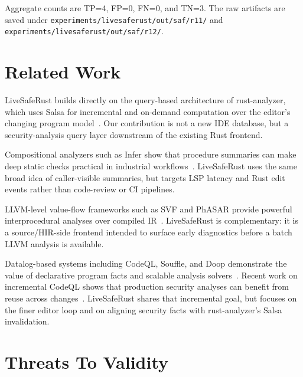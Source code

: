 \documentclass[sigconf,nonacm]{acmart}
\begin{document}
Aggregate counts are TP=4, FP=0, FN=0, and TN=3. The raw artifacts are saved
under \texttt{experiments/livesaferust/out/saf/r11/} and
\texttt{experiments/livesaferust/out/saf/r12/}.

\section{Related Work}

LiveSafeRust builds directly on the query-based architecture of
rust-analyzer, which uses Salsa for incremental and on-demand computation over
the editor's changing program model~\cite{rustanalyzer,salsa}. Our contribution
is not a new IDE database, but a security-analysis query layer downstream of
the existing Rust frontend.

Compositional analyzers such as Infer show that procedure summaries can make
deep static checks practical in industrial workflows~\cite{infer}. LiveSafeRust
uses the same broad idea of caller-visible summaries, but targets LSP latency
and Rust edit events rather than code-review or CI pipelines.

LLVM-level value-flow frameworks such as SVF and PhASAR provide powerful
interprocedural analyses over compiled IR~\cite{svf,phasar}. LiveSafeRust is
complementary: it is a source/HIR-side frontend intended to surface early
diagnostics before a batch LLVM analysis is available.

Datalog-based systems including CodeQL, Souffle, and Doop demonstrate the value
of declarative program facts and scalable analysis solvers~\cite{codeql,souffle,doop}.
Recent work on incremental CodeQL shows that production security analyses can
benefit from reuse across changes~\cite{inc-codeql}. LiveSafeRust shares that
incremental goal, but focuses on the finer editor loop and on aligning security
facts with rust-analyzer's Salsa invalidation.

\section{Threats To Validity}
\end{document}
